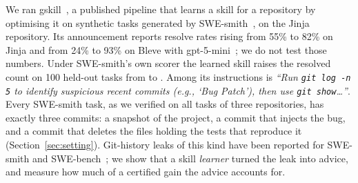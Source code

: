 \documentclass[sigconf,review,anonymous]{acmart}
\begin{document}
We ran gskill~\cite{gskill}, a published pipeline that learns a skill for a repository by optimising
it on synthetic tasks generated by SWE-smith~\cite{swesmith_paper_abs}, on the Jinja repository. Its announcement reports
resolve rates rising from 55\% to 82\% on Jinja and from 24\% to 93\% on Bleve with
gpt-5-mini~\cite{gskill}; we do not test those numbers. Under SWE-smith's own scorer
the learned skill raises the resolved count on 100 held-out tasks from \njinjaNone{} to
\njinjaSkill{}. Among its instructions is \emph{``Run \texttt{git log -n 5} to identify suspicious
recent commits (e.g., `Bug Patch'), then use \texttt{git show}\ldots''}. Every SWE-smith task, as we
verified on all \nhiTasks{} tasks of three repositories, has exactly three commits: a snapshot of the
project, a commit that injects the bug, and a commit that deletes the files holding the tests that
reproduce it (Section~\ref{sec:setting}). Git-history leaks of this kind have been reported for
SWE-smith and SWE-bench~\cite{marin_swesmith_git_leak,debuggym_swesmith_git_leak,
swebench_git_log_leak}; we show that a skill \emph{learner} turned the leak into advice, and
measure how much of a certified gain the advice accounts for.
\end{document}
